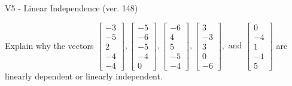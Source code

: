 \begin{exercise}
  \begin{exerciseTitle}V5 - Linear Independence (ver. 148)\end{exerciseTitle}
  \begin{exerciseStatement}
    Explain why the vectors \(\left[\begin{array}{r}
-3 \\
-5 \\
2 \\
-4 \\
-4
\end{array}\right] , \left[\begin{array}{r}
-5 \\
-6 \\
-5 \\
-4 \\
0
\end{array}\right] , \left[\begin{array}{r}
-6 \\
4 \\
5 \\
-5 \\
-4
\end{array}\right] , \left[\begin{array}{r}
3 \\
-3 \\
3 \\
0 \\
-6
\end{array}\right] , \text{ and } \left[\begin{array}{r}
0 \\
-4 \\
1 \\
-1 \\
5
\end{array}\right]\) are linearly dependent or linearly independent.	



\end{exerciseStatement}
\end{exercise}

